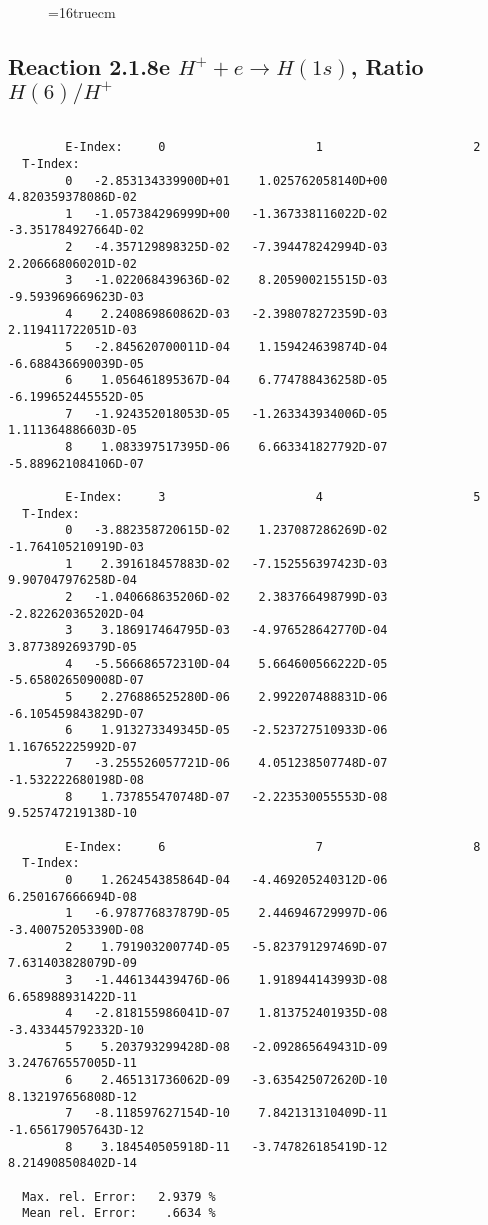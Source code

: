 \documentclass[12pt,dvipdfmx]{article}
\begin{document}
\begin{figure} \label{2.1.8rd}
\epsfxsize=16truecm
\end{figure}
\newpage



\subsection{
Reaction 2.1.8e  $H^+ + e \rightarrow H(1s) $,  Ratio $H(6)/H^+$
}

\begin{small}\begin{verbatim}

        E-Index:     0                     1                     2
  T-Index:
        0   -2.853134339900D+01    1.025762058140D+00    4.820359378086D-02
        1   -1.057384296999D+00   -1.367338116022D-02   -3.351784927664D-02
        2   -4.357129898325D-02   -7.394478242994D-03    2.206668060201D-02
        3   -1.022068439636D-02    8.205900215515D-03   -9.593969669623D-03
        4    2.240869860862D-03   -2.398078272359D-03    2.119411722051D-03
        5   -2.845620700011D-04    1.159424639874D-04   -6.688436690039D-05
        6    1.056461895367D-04    6.774788436258D-05   -6.199652445552D-05
        7   -1.924352018053D-05   -1.263343934006D-05    1.111364886603D-05
        8    1.083397517395D-06    6.663341827792D-07   -5.889621084106D-07

        E-Index:     3                     4                     5
  T-Index:
        0   -3.882358720615D-02    1.237087286269D-02   -1.764105210919D-03
        1    2.391618457883D-02   -7.152556397423D-03    9.907047976258D-04
        2   -1.040668635206D-02    2.383766498799D-03   -2.822620365202D-04
        3    3.186917464795D-03   -4.976528642770D-04    3.877389269379D-05
        4   -5.566686572310D-04    5.664600566222D-05   -5.658026509008D-07
        5    2.276886525280D-06    2.992207488831D-06   -6.105459843829D-07
        6    1.913273349345D-05   -2.523727510933D-06    1.167652225992D-07
        7   -3.255526057721D-06    4.051238507748D-07   -1.532222680198D-08
        8    1.737855470748D-07   -2.223530055553D-08    9.525747219138D-10

        E-Index:     6                     7                     8
  T-Index:
        0    1.262454385864D-04   -4.469205240312D-06    6.250167666694D-08
        1   -6.978776837879D-05    2.446946729997D-06   -3.400752053390D-08
        2    1.791903200774D-05   -5.823791297469D-07    7.631403828079D-09
        3   -1.446134439476D-06    1.918944143993D-08    6.658988931422D-11
        4   -2.818155986041D-07    1.813752401935D-08   -3.433445792332D-10
        5    5.203793299428D-08   -2.092865649431D-09    3.247676557005D-11
        6    2.465131736062D-09   -3.635425072620D-10    8.132197656808D-12
        7   -8.118597627154D-10    7.842131310409D-11   -1.656179057643D-12
        8    3.184540505918D-11   -3.747826185419D-12    8.214908508402D-14

  Max. rel. Error:   2.9379 %
  Mean rel. Error:    .6634 %


\end{verbatim}\end{small}
\end{document}

